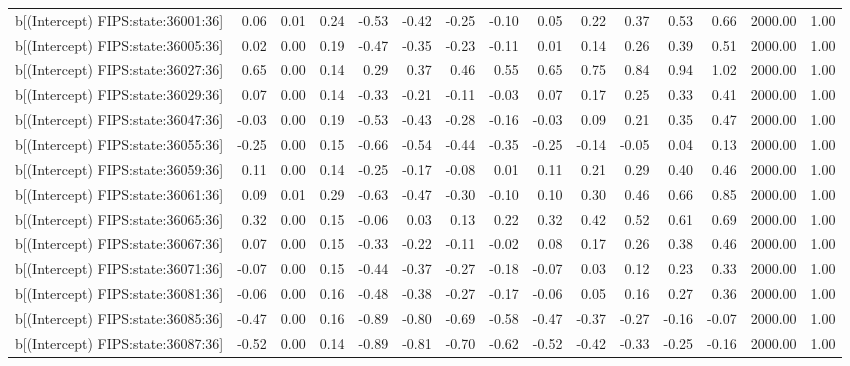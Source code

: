 \begin{table}[ht]
\begin{tabular}{rrrrrrrrrrrrrrr}
  b[(Intercept) FIPS:state:36001:36] & 0.06 & 0.01 & 0.24 & -0.53 & -0.42 & -0.25 & -0.10 & 0.05 & 0.22 & 0.37 & 0.53 & 0.66 & 2000.00 & 1.00 \\ 
  b[(Intercept) FIPS:state:36005:36] & 0.02 & 0.00 & 0.19 & -0.47 & -0.35 & -0.23 & -0.11 & 0.01 & 0.14 & 0.26 & 0.39 & 0.51 & 2000.00 & 1.00 \\ 
  b[(Intercept) FIPS:state:36027:36] & 0.65 & 0.00 & 0.14 & 0.29 & 0.37 & 0.46 & 0.55 & 0.65 & 0.75 & 0.84 & 0.94 & 1.02 & 2000.00 & 1.00 \\ 
  b[(Intercept) FIPS:state:36029:36] & 0.07 & 0.00 & 0.14 & -0.33 & -0.21 & -0.11 & -0.03 & 0.07 & 0.17 & 0.25 & 0.33 & 0.41 & 2000.00 & 1.00 \\ 
  b[(Intercept) FIPS:state:36047:36] & -0.03 & 0.00 & 0.19 & -0.53 & -0.43 & -0.28 & -0.16 & -0.03 & 0.09 & 0.21 & 0.35 & 0.47 & 2000.00 & 1.00 \\ 
  b[(Intercept) FIPS:state:36055:36] & -0.25 & 0.00 & 0.15 & -0.66 & -0.54 & -0.44 & -0.35 & -0.25 & -0.14 & -0.05 & 0.04 & 0.13 & 2000.00 & 1.00 \\ 
  b[(Intercept) FIPS:state:36059:36] & 0.11 & 0.00 & 0.14 & -0.25 & -0.17 & -0.08 & 0.01 & 0.11 & 0.21 & 0.29 & 0.40 & 0.46 & 2000.00 & 1.00 \\ 
  b[(Intercept) FIPS:state:36061:36] & 0.09 & 0.01 & 0.29 & -0.63 & -0.47 & -0.30 & -0.10 & 0.10 & 0.30 & 0.46 & 0.66 & 0.85 & 2000.00 & 1.00 \\ 
  b[(Intercept) FIPS:state:36065:36] & 0.32 & 0.00 & 0.15 & -0.06 & 0.03 & 0.13 & 0.22 & 0.32 & 0.42 & 0.52 & 0.61 & 0.69 & 2000.00 & 1.00 \\ 
  b[(Intercept) FIPS:state:36067:36] & 0.07 & 0.00 & 0.15 & -0.33 & -0.22 & -0.11 & -0.02 & 0.08 & 0.17 & 0.26 & 0.38 & 0.46 & 2000.00 & 1.00 \\ 
  b[(Intercept) FIPS:state:36071:36] & -0.07 & 0.00 & 0.15 & -0.44 & -0.37 & -0.27 & -0.18 & -0.07 & 0.03 & 0.12 & 0.23 & 0.33 & 2000.00 & 1.00 \\ 
  b[(Intercept) FIPS:state:36081:36] & -0.06 & 0.00 & 0.16 & -0.48 & -0.38 & -0.27 & -0.17 & -0.06 & 0.05 & 0.16 & 0.27 & 0.36 & 2000.00 & 1.00 \\ 
  b[(Intercept) FIPS:state:36085:36] & -0.47 & 0.00 & 0.16 & -0.89 & -0.80 & -0.69 & -0.58 & -0.47 & -0.37 & -0.27 & -0.16 & -0.07 & 2000.00 & 1.00 \\ 
  b[(Intercept) FIPS:state:36087:36] & -0.52 & 0.00 & 0.14 & -0.89 & -0.81 & -0.70 & -0.62 & -0.52 & -0.42 & -0.33 & -0.25 & -0.16 & 2000.00 & 1.00 \\ 

\end{tabular}
\end{table}

